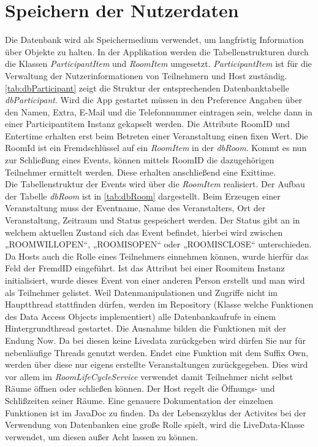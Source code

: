 \section{Speichern der Nutzerdaten}
\label{sec:Datenbank}
Die Datenbank wird als Speichermedium verwendet, um langfristig Information über Objekte zu halten. 
In der Applikation werden die Tabellenstrukturen durch die Klassen \textit{ParticipantItem} und \textit{RoomItem} umgesetzt. 
\textit{ParticipantItem} ist für die Verwaltung der Nutzerinformationen von Teilnehmern und Host zuständig.\\
 \cref{tab:dbParticipant} zeigt die Struktur der entsprechenden Datenbanktabelle \textit{dbParticipant}.
 Wird die App gestartet müssen in den Preference Angaben über den Namen, Extra, E-Mail und die Telefonnummer eintragen sein, welche dann in einer Participantitem Instanz gekapselt werden. 
Die Attribute RoomID und Entertime erhalten erst beim Betreten einer Veranstaltung einen fixen Wert. 
Die RoomId ist ein Fremdschlüssel auf ein \textit{RoomItem }in der \textit{dbRoom}.
Kommt es nun zur Schließung eines Events, können mittels RoomID die dazugehörigen Teilnehmer ermittelt werden. 
Diese erhalten anschließend eine Exittime.\\
Die Tabellenstruktur der Events wird über die \textit{RoomItem} realisiert. Der Aufbau der Tabelle \textit{dbRoom} ist in \cref{tab:dbRoom} dargestellt. 
Beim Erzeugen einer Veranstaltung muss der Eventname, Name des Veranstalters, Ort der Veranstaltung, Zeitraum und Status gespeichert werden. 
Der Status gibt an in welchem aktuellen Zustand sich das Event befindet, hierbei wird zwischen „ROOMWILLOPEN“, „ROOMISOPEN“ oder „ROOMISCLOSE“ unterschieden.
Da Hosts auch die Rolle eines Teilnehmers einnehmen können, wurde hierfür das Feld der FremdID eingeführt. 
Ist das Attribut bei einer Roomitem Instanz initialisiert, wurde dieses Event von einer anderen Person erstellt und man wird als Teilnehmer gelistet.
Weil Datenmanipulationen und Zugriffe nicht im Hauptthread stattfinden dürfen, werden im Repository (Klasse welche Funktionen des Data Access Objects implementiert) alle Datenbankaufrufe in einem Hintergrundthread gestartet.
Die Ausnahme bilden die Funktionen mit der Endung Now. 
Da bei diesen keine Livedata zurückgeben wird dürfen Sie nur für nebenläufige Threads genutzt werden. 
Endet eine Funktion mit dem Suffix Own, werden über diese nur eigens erstellte Veranstaltungen zurückgegeben.
Dies wird vor allem im \textit{RoomLifeCycleService} verwendet damit Teilnehmer nicht selbst Räume öffnen oder schließen können.
Der Host regelt die Öffnungs- und Schlißzeiten seiner Räume.
Eine genauere Dokumentation der einzelnen Funktionen ist im JavaDoc zu finden.
Da der Lebenszyklus der Activites bei der Verwendung von Datenbanken eine große Rolle  spielt, wird die LiveData-Klasse verwendet, um diesen außer Acht lassen zu können. 

